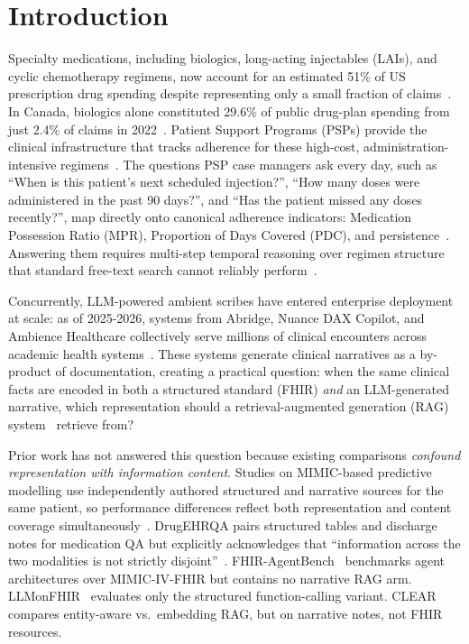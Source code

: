 \section{Introduction}
\label{sec:intro}

Specialty medications, including biologics, long-acting injectables (LAIs), and cyclic
chemotherapy regimens, now account for an estimated 51\% of US prescription drug spending
despite representing only a small fraction of claims~\citep{niu2024specialty}.  In Canada, biologics
alone constituted 29.6\% of public drug-plan spending from just 2.4\% of claims in
2022~\citep{cihi2023prescribed}.  Patient Support Programs (PSPs) provide the clinical
infrastructure that tracks adherence for these high-cost, administration-intensive
regimens~\citep{grundy2023psp}.  The questions PSP case managers ask every day, such as
``When is this patient's next scheduled injection?'', ``How many doses were administered
in the past 90 days?'', and ``Has the patient missed any doses recently?'', map directly
onto canonical adherence indicators: Medication Possession Ratio (MPR), Proportion of Days
Covered (PDC), and persistence~\citep{lociganic2015using}.  Answering them requires
multi-step temporal reasoning over regimen structure that standard free-text search cannot
reliably perform~\citep{yao2024chemotimelines}.

Concurrently, LLM-powered ambient scribes have entered enterprise deployment at scale:
as of 2025-2026, systems from Abridge, Nuance DAX Copilot, and Ambience Healthcare
collectively serve millions of clinical encounters across academic health
systems~\citep{tierney2024ambient,rotenstein2026changes}.  These systems generate clinical
narratives as a by-product of documentation, creating a practical question: when the same
clinical facts are encoded in both a structured standard (FHIR) \emph{and} an LLM-generated
narrative, which representation should a retrieval-augmented generation (RAG)
system~\citep{lewis2020retrieval} retrieve from?

Prior work has not answered this question because existing comparisons \emph{confound
representation with information content}.  Studies on MIMIC-based predictive modelling
use independently authored structured and narrative sources for the same patient, so
performance differences reflect both representation and content coverage
simultaneously~\citep{moldwin2021empirical}.  DrugEHRQA pairs structured tables and
discharge notes for medication QA but explicitly acknowledges that ``information across the
two modalities is not strictly disjoint''~\citep{bardhan2022drugehrqa}.
FHIR-AgentBench~\citep{lee2025fhiragentbench} benchmarks agent architectures over
MIMIC-IV-FHIR but contains no narrative RAG arm.  LLMonFHIR~\citep{schmiedmayer2025llmonfhir}
evaluates only the structured function-calling variant.
CLEAR~\citep{lopez2025clinical} compares entity-aware vs.\ embedding RAG, but on
narrative notes, not FHIR resources.

